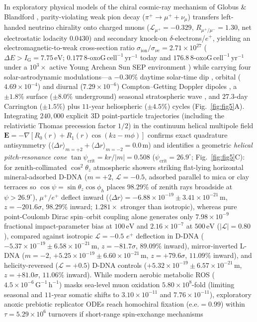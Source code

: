 \documentclass[10pt,letterpaper]{article}
\theoremstyle{plain}
\theoremstyle{definition}
\newcommand{\oxog}{\text{8-oxoG}}
\begin{document}
In exploratory physical models of the chiral cosmic-ray mechanism of Globus \& Blandford \cite{globus2020apjl,globus2021apj,globus2021muons}, parity-violating weak pion decay ($\pi^+ \to \mu^+ + \nu_\mu$) transfers left-handed neutrino chirality onto charged muons ($\mathcal{L}_{\mu^+} = -0.329$, $R_{\mu^+/\mu^-} = 1.30$, net electrostatic lodacity $0.0430$) and secondary knock-on $\delta$-electrons/$e^+$, yielding an electromagnetic-to-weak cross-section ratio $\sigma_{\mathrm{ion}}/\sigma_{\nu e} = 2.71 \times 10^{27}$ ($\Delta E > I_{\mathrm{G}} = 7.75\,\mathrm{eV}$; $0.177\,\oxog\,\mathrm{cell^{-1}\,yr^{-1}}$ today and $176.8\,\oxog\,\mathrm{cell^{-1}\,yr^{-1}}$ under a $10^3\times$ active Young Archean Sun SEP environment \cite{globus2020apjl}) while carrying four solar-astrodynamic modulations---a $-0.30\%$ daytime solar-time dip \cite{wang2025aps}, orbital ($4.69 \times 10^{-4}$) and diurnal ($7.29 \times 10^{-6}$) Compton--Getting Doppler dipoles \cite{abbasi2010icecube}, a $\pm 1.8\%$ surface ($\pm 8.0\%$ underground) seasonal stratospheric wave \cite{malgin2015jetp,gaisser2019icrc}, and $27.3$-day Carrington ($\pm 1.5\%$) plus $11$-year heliospheric ($\pm 4.5\%$) cycles (Fig.~\ref{fig:fig5}A). Integrating $240{,}000$ explicit 3D point-particle trajectories (including the relativistic Thomas precession factor $1/2$) in the continuum helical multipole field $\mathbf{E} = -\nabla[R_0(r) + R_1(r)\cos(kz - m\phi)]$ confirms exact quadrature antisymmetry ($\langle\Delta r\rangle_{m=+2} + \langle\Delta r\rangle_{m=-2} = 0.0\,\mathrm{m}$) and identifies a geometric \emph{helical pitch-resonance cone} $\tan\psi_{\mathrm{crit}} = kr/|m| = 0.508$ ($\psi_{\mathrm{crit}} = 26.9^\circ$; Fig.~\ref{fig:fig5}C): for zenith-collimated $\cos^2\theta_z$ atmospheric showers striking flat-lying horizontal mineral-adsorbed D-DNA ($m=+2$, $\mathcal{L} = -0.5$, adsorbed parallel to mica or clay terraces so $\cos\psi = \sin\theta_z\cos\phi_h$ places $98.29\%$ of zenith rays broadside at $\psi > 26.9^\circ$), $\mu^+/e^+$ deflect inward ($\langle\Delta r\rangle = -6.88 \times 10^{-19} \pm 3.41 \times 10^{-21}\,\mathrm{m}$, $z = -201.6\sigma$, $98.29\%$ inward; $1.281\times$ stronger than isotropic), whereas pure point-Coulomb Dirac spin--orbit coupling alone generates only $7.98 \times 10^{-9}$ fractional impact-parameter bias at $100\,\mathrm{eV}$ and $2.16 \times 10^{-7}$ at $500\,\mathrm{eV}$ ($|\mathcal{L}|=0.80$), compared against isotropic $\mathcal{L} = -0.5$ $e^+$ deflection in D-DNA ($-5.37 \times 10^{-19} \pm 6.58 \times 10^{-21}\,\mathrm{m}$, $z = -81.7\sigma$, $89.09\%$ inward), mirror-inverted L-DNA ($m=-2$, $+5.25 \times 10^{-19} \pm 6.60 \times 10^{-21}\,\mathrm{m}$, $z = +79.6\sigma$, $11.09\%$ inward), and helicity-reversed ($\mathcal{L} = +0.5$) D-DNA controls ($+5.32 \times 10^{-19} \pm 6.57 \times 10^{-21}\,\mathrm{m}$, $z = +81.0\sigma$, $11.06\%$ inward). While modern aerobic metabolic ROS ($4.5 \times 10^{-6}\,\mathrm{G^{-1}\,h^{-1}}$) masks sea-level muon oxidation $5.80 \times 10^8$-fold (limiting seasonal and $11$-year somatic shifts to $3.10 \times 10^{-11}$ and $7.76 \times 10^{-11}$), exploratory anoxic prebiotic replicator ODEs reach homochiral fixation ($\mathrm{e.e.} = 0.99$) within $\tau = 5.29 \times 10^6$ turnovers if short-range spin-exchange mechanisms 
\end{document}
